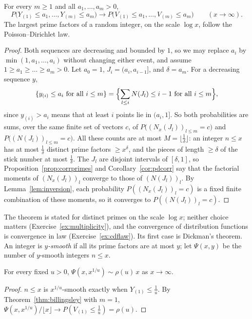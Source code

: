 \begin{theorem}[Billingsley, 1972]\label{thm:billingsley}
For every $m\ge1$ and all $a_1,\dots,a_m>0$,
\[
P\bigl(Y_{(1)}\le a_1,\dots,Y_{(m)}\le a_m\bigr)\longrightarrow P\bigl(V_{(1)}\le a_1,\dots,V_{(m)}\le a_m\bigr)\qquad(x\to\infty).
\]
The largest prime factors of a random integer, on the scale $\log x$, follow the Poisson--Dirichlet law.
\end{theorem}
\begin{proof}
Both sequences are decreasing and bounded by $1$, so we may replace $a_i$ by $\min(1,a_1,\dots,a_i)$ without changing either event, and assume $1\ge a_1\ge\dots\ge a_m>0$. Let $a_0=1$, $J_i=(a_i,a_{i-1}]$, and $\delta=a_m$. For a decreasing sequence $y$,
\[
\{y_{(i)}\le a_i\text{ for all }i\le m\}=\Bigl\{\sum_{l\le i}N(J_l)\le i-1\text{ for all }i\le m\Bigr\},
\]
since $y_{(i)}>a_i$ means that at least $i$ points lie in $(a_i,1]$. So both probabilities are sums, over the same finite set of vectors $c$, of $P\bigl((N_x(J_l))_{l\le m}=c\bigr)$ and $P\bigl((N(J_l))_{l\le m}=c\bigr)$. All these counts are at most $M=\lfloor\frac1\delta\rfloor$: an integer
$n\le x$ has at most $\frac1\delta$ distinct prime factors $\ge x^\delta$, and the pieces of length $\ge\delta$ of the stick number at most $\frac1\delta$. The $J_l$ are disjoint intervals of $[\delta,1]$, so Proposition~\ref{prop:corrprimes} and Corollary~\ref{cor:pdcorr} say that the factorial moments
of $(N_x(J_l))_l$ converge to those of $(N(J_l))_l$. By Lemma~\ref{lem:inversion}, each probability $P((N_x(J_l))_l=c)$ is a fixed finite combination of these moments, so it converges to $P((N(J_l))_l=c)$.
\end{proof}

The theorem is stated for distinct primes on the scale $\log x$; neither choice matters (Exercise~\ref{ex:multiplicity}), and the convergence of distribution functions is convergence in law (Exercise~\ref{ex:cdflaw}). Its first case is Dickman's theorem. An integer
is \emph{$y$-smooth} if all its prime factors are at most $y$; let $\Psi(x,y)$ be the number of $y$-smooth integers $n\le x$.

\begin{corollary}[Dickman, 1930]\label{cor:smooth}
For every fixed $u>0$, $\Psi(x,x^{1/u})\sim\rho(u)\,x$ as $x\to\infty$.
\end{corollary}
\begin{proof}
$n\le x$ is $x^{1/u}$-smooth exactly when $Y_{(1)}\le\frac1u$. By Theorem~\ref{thm:billingsley} with $m=1$, $\Psi(x,x^{1/u})/\lfloor x\rfloor\to P(V_{(1)}\le\frac1u)=\rho(u)$.
\end{proof}

